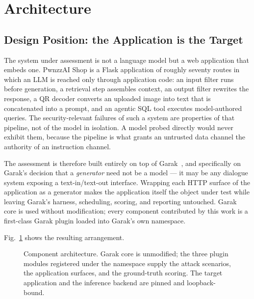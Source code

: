 ﻿%
\section{Architecture}
\label{sec:architecture}

\subsection{Design Position: the Application is the Target}
\label{sec:arch:position}

The system under assessment is not a language model but a web
application that embeds one. PwnzzAI Shop is a Flask application of
roughly seventy routes in which an LLM is reached only through
application code: an input filter runs before generation, a retrieval
step assembles context, an output filter rewrites the response, a QR
decoder converts an uploaded image into text that is concatenated into
a prompt, and an agentic SQL tool executes model-authored queries. The
security-relevant failures of such a system are properties of that
pipeline, not of the model in isolation. A model probed directly would
never exhibit them, because the pipeline is what grants an untrusted
data channel the authority of an instruction channel.

The assessment is therefore built entirely on top of Garak~\cite{garak},
and specifically on Garak's decision that a \emph{generator} need not be a
model --- it may be any dialogue system exposing a text-in/text-out
interface. Wrapping each HTTP surface of the application as a generator
makes the application itself the object under test while leaving Garak's
harness, scheduling, scoring, and reporting untouched. Garak core is used
without modification; every component contributed by this work is a
first-class Garak plugin loaded into Garak's own namespace.

Fig.~\ref{fig:architecture} shows the resulting arrangement.

\begin{figure}[t]
  \centering
  \caption{Component architecture. Garak core is unmodified; the three
  plugin modules registered under the  namespace supply the
  attack scenarios, the application surfaces, and the ground-truth
  scoring. The target application and the inference backend are pinned
  and loopback-bound.}
  \label{fig:architecture}
\end{figure}

